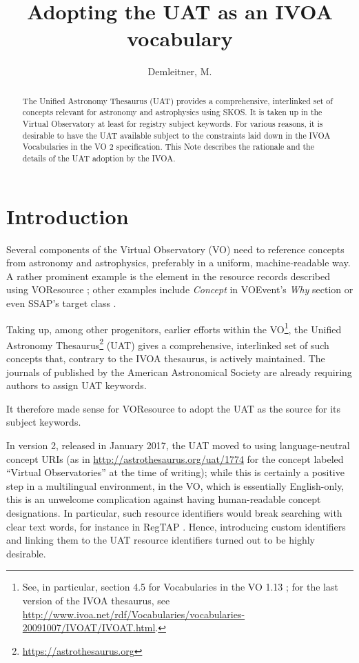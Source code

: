 \documentclass[11pt,a4paper]{ivoa}
\title{Adopting the UAT as an IVOA vocabulary}
\author[https://wiki.ivoa.net/twiki/bin/view/IVOA/MarkusDemleitner]{Demleitner, M.}
\begin{document}
\begin{abstract}
The Unified Astronomy Thesaurus (UAT) provides a comprehensive, interlinked
set of concepts relevant for astronomy and astrophysics using SKOS.  It
is taken up in the Virtual Observatory at least for registry subject
keywords.  For various reasons, it is desirable to have the UAT
available subject to the constraints laid down in the IVOA Vocabularies in
the VO 2 specification.  This Note describes the rationale and the
details of the UAT adoption by the IVOA.
\end{abstract}



\section{Introduction}

Several components of the Virtual Observatory (VO) need to reference
concepts from astronomy and astrophysics, preferably in a uniform,
machine-readable way.  A rather prominent example is the 
element in the resource records described using VOResource
\citep{2018ivoa.spec.0625P}; other examples include \emph{Concept} in
VOEvent's \emph{Why} section \citep{2011ivoa.spec.0711S} or even SSAP's
target class \citep{2012ivoa.spec.0210T}.

Taking up, among other progenitors, earlier efforts within the
VO\footnote{See, in particular, section 4.5 for Vocabularies in the VO
1.13 \citep{2009ivoa.spec.1007G}; for the last version of the IVOA
thesaurus, see
\url{http://www.ivoa.net/rdf/Vocabularies/vocabularies-20091007/IVOAT/IVOAT.html}.},
the Unified Astronomy
Thesaurus\footnote{\url{https://astrothesaurus.org}} (UAT) gives a
comprehensive, interlinked set of such concepts that, contrary to the
IVOA thesaurus, is actively maintained.  The journals of published by
the American Astronomical Society are already requiring authors to
assign UAT keywords.  

It therefore made sense for VOResource to adopt the UAT as the source
for its subject keywords.

In version 2, released in January 2017, the UAT 
moved to using language-neutral
concept URIs (as in \url{http://astrothesaurus.org/uat/1774} for the
concept labeled ``Virtual Observatories'' at the time of writing); while
this is certainly a positive step in a multilingual environment, in the
VO, which is essentially English-only, this is an unwelcome complication
against having human-readable concept designations.  In particular, such
resource identifiers would break searching with clear text words, for
instance in RegTAP \citep{2019ivoa.spec.1011D}.  Hence, introducing
custom identifiers and linking them to the UAT resource identifiers
turned out to be highly desirable.
\end{document}
